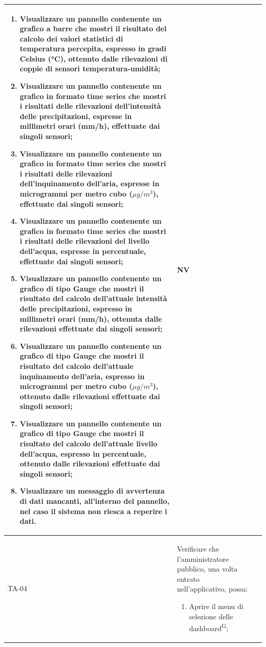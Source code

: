 \documentclass[8pt]{article}
\newcommand{\glossterm}[1]{#1\textsuperscript{G}} %
\begin{document}
\begin{longtable}{|>{\centering}p{2cm}|>{\RaggedRight}m{12cm}|>{\centering\arraybackslash}p{2cm}|}
\begin{enumerate}[start=8]
        \item Visualizzare un pannello contenente un grafico a barre che mostri il risultato
            del calcolo dei valori statistici di temperatura percepita, espresso in gradi Celsius (°C), ottenuto dalle rilevazioni di coppie di sensori temperatura-umidità;
        \item Visualizzare un pannello contenente un grafico in formato time series che mostri i
            risultati delle rilevazioni dell’intensità delle precipitazioni, espresse in millimetri orari (mm/h), effettuate dai
            singoli sensori;
        \item Visualizzare un pannello contenente un grafico in formato time series che mostri i
            risultati delle rilevazioni dell’inquinamento dell'aria, espresse in microgrammi per metro cubo ($\mu g / m^3$), effettuate dai
            singoli sensori;
        \item Visualizzare un pannello contenente un grafico in formato time series che mostri i
            risultati delle rilevazioni del livello dell'acqua, espresse in percentuale, effettuate dai
            singoli sensori;
        \item Visualizzare un pannello contenente un grafico di tipo Gauge che mostri il risultato
            del calcolo dell'attuale intensità delle precipitazioni, espresso in millimetri orari (mm/h), ottenuta dalle rilevazioni effettuate dai singoli sensori;
        \item Visualizzare un pannello contenente un grafico di tipo Gauge che mostri il risultato
            del calcolo dell'attuale inquinamento dell'aria, espresso in microgrammi per metro cubo ($\mu g / m^3$), ottenuto dalle rilevazioni effettuate dai singoli sensori;
        \item Visualizzare un pannello contenente un grafico di tipo Gauge che mostri il risultato
            del calcolo dell'attuale livello dell'acqua, espresso in percentuale, ottenuto dalle rilevazioni effettuate dai singoli sensori;
        \item Visualizzare un messaggio di avvertenza di dati mancanti, all’interno del pannello, nel caso il sistema non riesca a reperire i dati.
    \end{enumerate}
    & NV \\
    \hline
    TA-04 & Verificare che l'amministratore pubblico, una volta entrato nell'applicativo, possa:
    \begin{enumerate}
        \setlength\itemsep{0em}
        \item Aprire il menu di selezione delle \glossterm{dashboard};

\end{enumerate}
\end{longtable}
\end{document}
